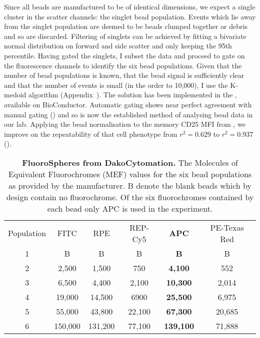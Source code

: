 Since all beads are manufactured to be of identical dimensions, we expect a single cluster in the scatter channels: the singlet bead population.
Events which lie away from the singlet population are deemed to be beads clumped together or debris and so are discarded.
Filtering of singlets can be achieved by fitting a bivariate normal distribution on forward and side scatter and only keeping the 95th percentile.
Having gated the singlets, I subset the data and proceed to gate on the fluorescence channels to identify the six bead populations.
Given that the number of bead populations is known, that the bead signal is sufficiently clear and that the number of events is small (in the order to 10,000),
I use the K-medoid algorithm (Appendix~).
The solution has been implemented in the , available on BioConductor.
Automatic gating shows near perfect agreement with manual gating () and so is now the established method of analysing
bead data in our lab.
Applying the bead normalisation to the memory CD25 MFI from , we improve on the repeatability of that 
cell phenotype from $r^2=0.629$ to $r^2=0.937$ ().

\clearpage

\begin{table} [hb]
\begin{center}
\begin{tabular} {|c c c c c c|}
\cline{1-6}
Population  & FITC    & RPE     & REP-Cy5 & \textbf{APC}     & PE-Texas Red\\
\cline{1-6}
1           & B       & B       & B       & \textbf{B}       & B \\
2           & 2,500   & 1,500   & 750     & \textbf{4,100}   & 552\\
3           & 6,500   & 4,400   & 2,100   & \textbf{10,300}  & 2,014\\
4           & 19,000  & 14,500  & 6900    & \textbf{25,500}  & 6,975\\
5           & 55,000  & 43,800  & 22,100  & \textbf{67,300}  & 20,685\\
6           & 150,000 & 131,200 & 77,100  & \textbf{139,100} & 71,888\\
\cline{1-6}
\end{tabular}
\end{center}
\caption{
\label{table:fluorospheres}
\textbf{FluoroSpheres from DakoCytomation.}
The Molecules of Equivalent Fluorochromes (MEF) values for the six bead populations as provided by the manufacturer.
B denote the blank beads which by design contain no fluorochrome.
Of the six fluorochromes contained by each bead only APC is used in the experiment.
}
\end{table}

